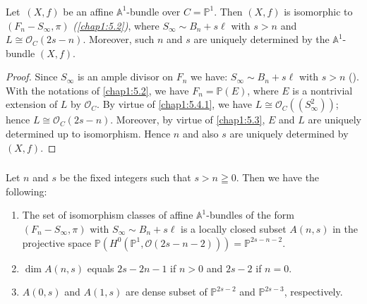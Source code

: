 \subsubsection{}\label{chap1:5.5.1}
\begin{lemma*}
Let\pageoriginale\ $(X,f)$ be an affine $\mathbb{A}^{1}$-bundle over
$C=\mathbb{P}^{1}$. Then $(X,f)$ is isomorphic to
$(F_{n}-S_{\infty},\pi)$ {\em (\cf \ref{chap1:5.2})}, where $S_{\infty}\sim
B_{n}+s\ell$ with $s>n$ and $L\cong \mathscr{O}_{C}(2s-n)$. Moreover,
such $n$ and $s$ are uniquely determined by the
$\mathbb{A}^{1}$-bundle $(X,f)$. 
\end{lemma*}

\begin{proof}
Since $S_{\infty}$ is an ample divisor on $F_{n}$ we have:
$S_{\infty}\sim B_{n}+s\ell$ with $s>n$ (\cf \cite{16}). With the
notations of \ref{chap1:5.2}, we have $F_{n}=\mathbb{P}(E)$, where $E$ is a
nontrivial extension of $L$ by $\mathscr{O}_{C}$. By virtue of
\ref{chap1:5.4.1}, we have $L\cong \mathscr{O}_{C}((S^{2}_{\infty}))$;
hence $L\cong \mathscr{O}_{C}(2s-n)$. Moreover, by virtue of
\ref{chap1:5.3}, $E$ and $L$ are uniquely determined up to
isomorphism. Hence $n$ and also $s$ are uniquely determined by
$(X,f)$.
\end{proof}

\subsubsection{}\label{chap1:5.5.2}
\begin{lemma*}
  Let $n$ and $s$ be the fixed integers such that $s>n\geqq 0$. Then we
  have the following:
  \begin{enumerate}
    \renewcommand{\labelenumi}{\rm(\theenumi)}
  \item The set of isomorphism classes of affine
    $\mathbb{A}^{1}$-bundles of the form $(F_{n}-S_{\infty},\pi)$ with
    $S_{\infty}\sim B_{n}+s\ell$ is a locally closed subset $A(n,s)$ in
    the projective space
    $\mathbb{P}(H^{0}(\mathbb{P}^{1},\mathscr{O}(2s-n-2)))=\mathbb{P}^{2s-n-2}$. 
    
  \item $\dim A(n,s)$ equals $2s-2n-1$ if $n>0$ and $2s-2$ if $n=0$.
    
  \item $A(0,s)$ and $A(1,s)$ are dense subset of $\mathbb{P}^{2s-2}$
    and $\mathbb{P}^{2s-3}$, respectively.
  \end{enumerate}
\end{lemma*}

